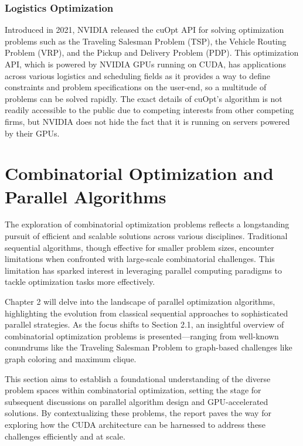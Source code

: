 \documentclass[11pt]{report}
\begin{document}
    \subsection{Logistics Optimization}
    Introduced in 2021, NVIDIA released the cuOpt API for solving optimization problems such as the Traveling Salesman Problem (TSP), the Vehicle Routing Problem (VRP), and the Pickup and Delivery Problem (PDP)\cite{WORLD_RECORD_OPTIMIZATION}\cite{CUOPT_USER_GUIDE}. This optimization API, which is powered by NVIDIA GPUs running on CUDA, has applications across various logistics and scheduling fields as it provides a way to define constraints and problem specifications on the user-end, so a multitude of problems can be solved rapidly. The exact details of cuOpt's algorithm is not readily accessible to the public due to competing interests from other competing firms, but NVIDIA does not hide the fact that it is running on servers powered by their GPUs.


\chapter{Combinatorial Optimization and Parallel Algorithms}
The exploration of combinatorial optimization problems reflects a longstanding pursuit of efficient and scalable solutions across various disciplines. Traditional sequential algorithms, though effective for smaller problem sizes, encounter limitations when confronted with large-scale combinatorial challenges. This limitation has sparked interest in leveraging parallel computing paradigms to tackle optimization tasks more effectively.

Chapter 2 will delve into the landscape of parallel optimization algorithms, highlighting the evolution from classical sequential approaches to sophisticated parallel strategies. As the focus shifts to Section 2.1, an insightful overview of combinatorial optimization problems is presented—ranging from well-known conundrums like the Traveling Salesman Problem to graph-based challenges like graph coloring and maximum clique.

This section aims to establish a foundational understanding of the diverse problem spaces within combinatorial optimization, setting the stage for subsequent discussions on parallel algorithm design and GPU-accelerated solutions. By contextualizing these problems, the report paves the way for exploring how the CUDA architecture can be harnessed to address these challenges efficiently and at scale.
\end{document}

